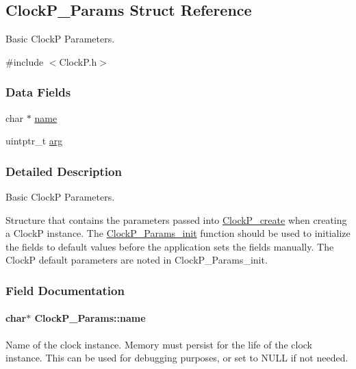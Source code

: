 \subsection{Clock\+P\+\_\+\+Params Struct Reference}
\label{struct_clock_p___params}


Basic Clock\+P Parameters.  




{\ttfamily \#include $<$Clock\+P.\+h$>$}

\subsubsection*{Data Fields}
\begin{DoxyCompactItemize}
\item 
char $\ast$ \hyperlink{struct_clock_p___params_aa569bbe76191ffc32ba1b6774002d83a}{name}
\item 
uintptr\+\_\+t \hyperlink{struct_clock_p___params_a262d7e91bc0a7f98b23033084e68531c}{arg}
\end{DoxyCompactItemize}


\subsubsection{Detailed Description}
Basic Clock\+P Parameters. 

Structure that contains the parameters passed into \hyperlink{_clock_p_8h_a1eab19790e2a9a2ed41fb4d900a3e12e}{Clock\+P\+\_\+create} when creating a Clock\+P instance. The \hyperlink{_clock_p_8h_a666e9ded465c969456e6c4ef95e849f4}{Clock\+P\+\_\+\+Params\+\_\+init} function should be used to initialize the fields to default values before the application sets the fields manually. The Clock\+P default parameters are noted in Clock\+P\+\_\+\+Params\+\_\+init. 

\subsubsection{Field Documentation}
\paragraph[{name}]{\setlength{\rightskip}{0pt plus 5cm}char$\ast$ Clock\+P\+\_\+\+Params\+::name}\label{struct_clock_p___params_aa569bbe76191ffc32ba1b6774002d83a}
Name of the clock instance. Memory must persist for the life of the clock instance. This can be used for debugging purposes, or set to N\+U\+L\+L if not needed. 
